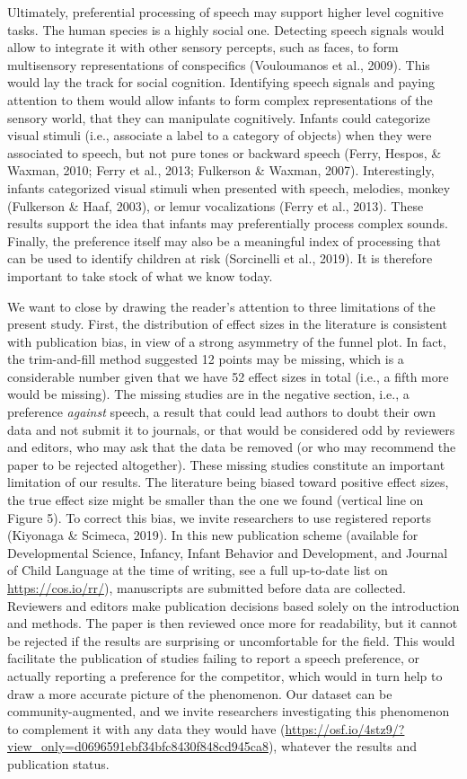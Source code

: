 \documentclass[man]{apa6}
\begin{document}
Ultimately, preferential processing of speech may support higher level
cognitive tasks. The human species is a highly social one. Detecting
speech signals would allow to integrate it with other sensory percepts,
such as faces, to form multisensory representations of conspecifics
(Vouloumanos et al., 2009). This would lay the track for social
cognition. Identifying speech signals and paying attention to them would
allow infants to form complex representations of the sensory world, that
they can manipulate cognitively. Infants could categorize visual stimuli
(i.e., associate a label to a category of objects) when they were
associated to speech, but not pure tones or backward speech (Ferry,
Hespos, \& Waxman, 2010; Ferry et al., 2013; Fulkerson \& Waxman, 2007).
Interestingly, infants categorized visual stimuli when presented with
speech, melodies, monkey (Fulkerson \& Haaf, 2003), or lemur
vocalizations (Ferry et al., 2013). These results support the idea that
infants may preferentially process complex sounds. Finally, the
preference itself may also be a meaningful index of processing that can
be used to identify children at risk (Sorcinelli et al., 2019). It is
therefore important to take stock of what we know today.

We want to close by drawing the reader's attention to three limitations
of the present study. First, the distribution of effect sizes in the
literature is consistent with publication bias, in view of a strong
asymmetry of the funnel plot. In fact, the trim-and-fill method
suggested 12 points may be missing, which is a considerable number given
that we have 52 effect sizes in total (i.e., a fifth more would be
missing). The missing studies are in the negative section, i.e., a
preference \emph{against} speech, a result that could lead authors to
doubt their own data and not submit it to journals, or that would be
considered odd by reviewers and editors, who may ask that the data be
removed (or who may recommend the paper to be rejected altogether).
These missing studies constitute an important limitation of our results.
The literature being biased toward positive effect sizes, the true
effect size might be smaller than the one we found (vertical line on
Figure 5). To correct this bias, we invite researchers to use registered
reports (Kiyonaga \& Scimeca, 2019). In this new publication scheme
(available for Developmental Science, Infancy, Infant Behavior and
Development, and Journal of Child Language at the time of writing, see a
full up-to-date list on \url{https://cos.io/rr/}), manuscripts are
submitted before data are collected. Reviewers and editors make
publication decisions based solely on the introduction and methods. The
paper is then reviewed once more for readability, but it cannot be
rejected if the results are surprising or uncomfortable for the field.
This would facilitate the publication of studies failing to report a
speech preference, or actually reporting a preference for the
competitor, which would in turn help to draw a more accurate picture of
the phenomenon. Our dataset can be community-augmented, and we invite
researchers investigating this phenomenon to complement it with any data
they would have
(\url{https://osf.io/4stz9/?view_only=d0696591ebf34bfc8430f848cd945ca8}),
whatever the results and publication status.
\end{document}
